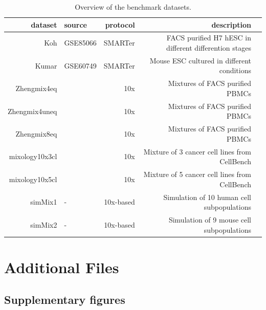 \documentclass{bmcart}
\begin{document}
\begin{backmatter}
\begin{table}[h!]
\caption{Overview of the benchmark datasets.}
\label{tab:table1}
\begin{tabular}{rlrrl}
  \hline
dataset & source & protocol & description \\ 
  \hline
Koh & GSE85066 & SMARTer & FACS purified H7 hESC in different differention stages \\ 
  Kumar & GSE60749 & SMARTer & Mouse ESC cultured in different conditions \\ 
  Zhengmix4eq & \citep{duoClustering2018} & 10x & Mixtures of FACS purified PBMCs \\ 
  Zhengmix4uneq & \citep{duoClustering2018} & 10x & Mixtures of FACS purified PBMCs \\ 
  Zhengmix8eq & \citep{duoClustering2018} & 10x & Mixtures of FACS purified PBMCs \\ 
  mixology10x3cl & \cite{tianMixology2018} & 10x & Mixture of 3  cancer cell lines from CellBench \\ 
  mixology10x5cl & \cite{tianMixology2018} & 10x & Mixture of 5 cancer cell lines from CellBench \\ 
  simMix1 & - & 10x-based & Simulation of 10 human cell subpopulations \\
  simMix2 & - & 10x-based & Simulation of 9 mouse cell subpopulations \\
   \hline
\end{tabular}
\end{table}


\section*{Additional Files}
  \subsection*{Supplementary figures}

\end{backmatter}
\end{document}
